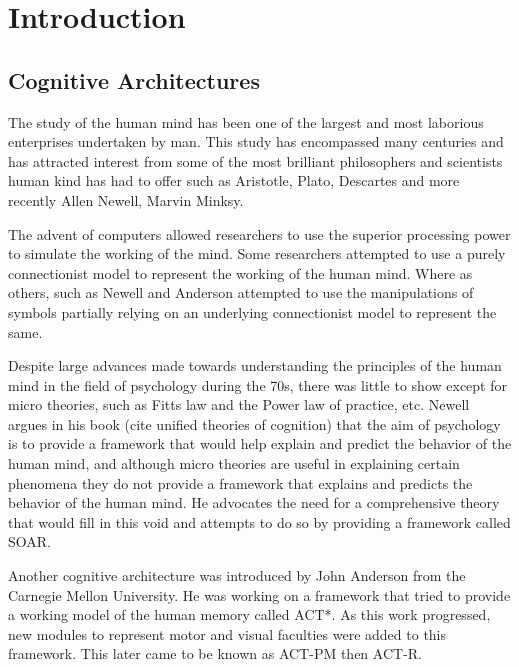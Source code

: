 \chapter{Introduction}
\label{chap-one}


\section {Cognitive Architectures}
\label{introCogArch}
The study of the human mind has been one of the largest and most
laborious enterprises undertaken by man. This study has encompassed many
centuries and has attracted interest from some of the most brilliant
philosophers and scientists human kind has had to offer such as
Aristotle, Plato, Descartes and more recently Allen Newell, Marvin
Minksy. 

The advent of computers allowed researchers to use the superior
processing power to simulate the working of the
mind. Some researchers attempted to use a purely connectionist model to
represent the working of the human mind. Where as
others, such as Newell and Anderson attempted to use the manipulations
of symbols partially relying on an underlying connectionist model to
represent the same.  

Despite large advances made towards understanding the principles of
the human mind in the field of psychology during the 70s, there was little to show
except for micro theories, such as Fitts law and the Power law of
practice, etc. Newell argues in his book (cite unified theories
of cognition) that the aim of psychology is to provide a framework
that would help explain and predict the behavior of the human mind, and although micro
theories are useful in explaining certain phenomena they do not provide a
framework that explains and predicts the behavior of the human
mind. He advocates the need for a comprehensive theory that would fill
in this void and attempts to do so by providing a framework called SOAR. 

Another cognitive architecture was introduced by John Anderson from
the Carnegie Mellon University. He was working on a framework that
tried to provide a working model of the 
human memory called ACT*. As this work progressed, new modules to
represent motor and visual faculties were added to this
framework. This later came to be known as ACT-PM then ACT-R. 

